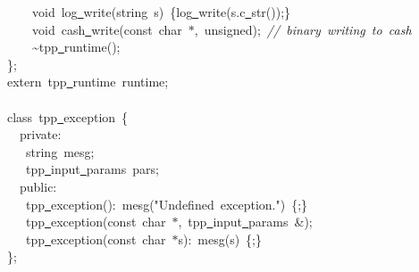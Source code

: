 \documentclass[a4paper,10pt]{article}
\begin{document}
{\ \ \ \ void\ log\underline\ write(string\ s)\ \{log\underline\ write(s.c\underline\ str());\}\\
\ \ \ \ void\ cash\underline\ write(const\ char\ $\ast$,\ unsigned);\ \textsl{//\ binary\ writing\ to\ cash}\\
\ \ \ \ \textasciitilde tpp\underline\ runtime();\\
\};\\
extern\ tpp\underline\ runtime\ runtime;\\
\ \\
class\ tpp\underline\ exception\ \{\\
\ \ private:\\
\ \ \ string\ mesg;\\
\ \ \ tpp\underline\ input\underline\ params\ pars;\\
\ \ public:\\
\ \ \ tpp\underline\ exception():\ mesg("{}Undefined\ exception."{})\ \{;\}\\
\ \ \ tpp\underline\ exception(const\ char\ $\ast$,\ tpp\underline\ input\underline\ params\ \&);\\
\ \ \ tpp\underline\ exception(const\ char\ $\ast$s):\ mesg(s)\ \{;\}\\
\};\\
\ \\
\ \\
\ \\
 }
\normalfont\normalsize
\end{document}

